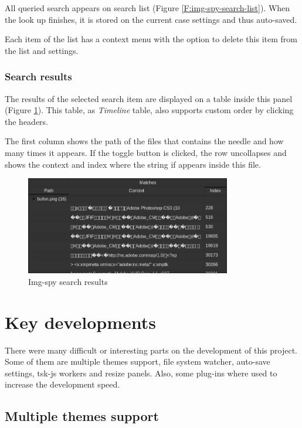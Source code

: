 All queried search appears on search list (Figure
\ref{F:img-spy-search-list}). When the look up finishes, it is stored on the
current case settings and thus auto-saved.

Each item of the list has a context menu with the option to delete this item
from the list and settings.

\subsubsection{Search results}

The results of the selected search item are displayed on a table inside this
panel (Figure \ref{F:img-spy-search-results}). This table, as \textit{Timeline}
table, also supports custom order by clicking the headers.

The first column shows the path of the files that contains the needle and 
how many times it appears. If the toggle button is clicked, the row
uncollapses and shows the context and index where the string if appears inside
this file.

\begin{figure}[htb]
	\begin{center}
		\includegraphics[width=0.8\textwidth]
		{./figures/search-results.png}
		\caption{Img-spy search results}
		\label{F:img-spy-search-results}
	\end{center}
\end{figure}

\section{Key developments}

There were many difficult or interesting parts on the development of this 
project. Some of them are multiple themes support, file system watcher, 
auto-save settings, tsk-js workers and resize panels. Also, some plug-ins where
used to increase the development speed.

\subsection{Multiple themes support}

